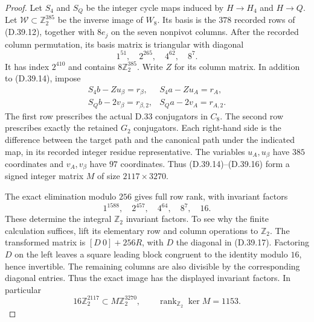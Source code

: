 \begin{proof}
Let $S_4$ and $S_Q$ be the integer cycle maps induced by
$H\to H_4$ and $H\to Q$. Let $\mathcal W\subset
\mathbb Z_2^{385}$ be the inverse image of $W_8$.
Its basis is the $378$ recorded rows of (D.39.12),
together with $8e_j$ on the seven nonpivot columns.
After the recorded column permutation, its basis
matrix is triangular with diagonal
\[
 1^{51},\quad 2^{265},\quad4^{62},\quad8^7.
                                                               \tag{D.39.15}
\]
It has index $2^{410}$ and contains $8\mathbb Z_2^{385}$.
Write $Z$ for its column matrix. In addition to
(D.39.14), impose
\[
 \begin{array}{ll}
 S_4b-Zu_\beta=r_\beta,&S_4a-Zu_A=r_A,\\
 S_Qb-2v_\beta=r_{\beta,2},&S_Qa-2v_A=r_{A,2}.
 \end{array}                                                   \tag{D.39.16}
\]
The first row prescribes the actual D.33 conjugators in
$C_8$. The second row prescribes exactly the retained
$G_2$ conjugators. Each right-hand side is the difference
between the target path and the canonical path under
the indicated map, in its recorded integer residue
representative. The variables $u_A,u_\beta$ have $385$
coordinates and $v_A,v_\beta$ have $97$ coordinates.
Thus (D.39.14)--(D.39.16) form a signed integer matrix
$M$ of size $2117\times3270$.

The exact elimination modulo $256$ gives full row rank,
with invariant factors
\[
 1^{1588},\quad2^{457},\quad4^{64},\quad8^7,\quad16.
                                                               \tag{D.39.17}
\]
These determine the integral $\mathbb Z_2$ invariant
factors. To see why the finite calculation suffices,
lift its elementary row and column operations to
$\mathbb Z_2$. The transformed matrix is
$[D\ 0]+256R$, with $D$ the diagonal in (D.39.17).
Factoring $D$ on the left leaves a square leading block
congruent to the identity modulo $16$, hence invertible.
The remaining columns are also divisible by the
corresponding diagonal entries. Thus the exact image
has the displayed invariant factors. In particular
\[
 16\mathbb Z_2^{2117}\subset M\mathbb Z_2^{3270},
 \qquad \operatorname{rank}_{\mathbb Z_2}\ker M=1153.
                                                               \tag{D.39.18}
\]


\end{proof}

